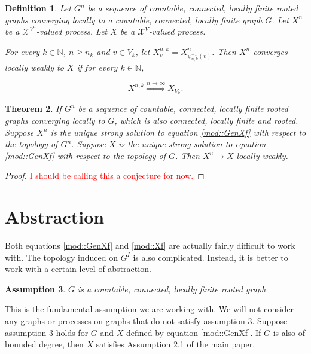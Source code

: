 \documentclass[12pt]{article}
\newcommand{\mb}{\mathbb}
\newcommand{\mc}{\mathcal}
\newcommand{\ra}{\rightarrow}
\newcommand{\os}{\overset}
\newcommand{\tr}{\textcolor{red}}
\newcommand{\ind}{\hspace{24pt}}
\newcommand{\Xf}{X}									%
\newcommand{\stte}{\mc{X}}							%
\newcommand{\inter}[1]{#1^I}
\newtheorem{thms}{Theorem}[section]
\newtheorem{defn}[thms]{Definition}
\newtheorem{assu}[thms]{Assumption}
\begin{document}
\begin{defn}
Let \(G^n\) be a sequence of countable, connected, locally finite rooted graphs converging locally to a countable, connected, locally finite graph \(G\). Let \(\Xf^n\) be a \(\stte^{V^n}\)-valued process. Let \(\Xf\) be a \(\stte^V\)-valued process. 

\ind For every \(k\in \mb{N}\), \(n \geq n_k\) and \(v \in V_k\), let \(\Xf^{n,k}_v = \Xf^n_{\psi_{n,k}^{-1}(v)}\). Then \(\Xf^n\) converges locally weakly to \(\Xf\) if for every \(k \in \mb{N}\),

\[\Xf^{n,k} \os{n\ra\infty}{\Rightarrow} \Xf_{V_k}.\]
\label{mod::locweak}
\end{defn}

\begin{thms}
If \(G^n\) be a sequence of countable, connected, locally finite rooted graphs converging locally to \(G\), which is also connected, locally finite and rooted. Suppose \(\Xf^n\) is the unique strong solution to equation \eqref{mod::GenXf} with respect to the topology of \(G^n\). Suppose \(\Xf\) is the unique strong solution to equation \eqref{mod::GenXf} with respect to the topology of \(G\). Then \(\Xf^n \ra \Xf\) locally weakly.
\label{lblocweak}
\end{thms}
\begin{proof}
\tr{I should be calling this a conjecture for now.}
\end{proof}

\section{Abstraction}
\label{abs}

Both equations \eqref{mod::GenXf} and \eqref{mod::Xf} are actually fairly difficult to work with. The topology induced on \(\inter{G}\) is also complicated. Instead, it is better to work with a certain level of abstraction.

\begin{assu}
\(G\) is a countable, connected, locally finite rooted graph.
\label{abs::basics}
\end{assu}

This is the fundamental assumption we are working with. We will not consider any graphs or processes on graphs that do not satisfy assumption \ref{abs::basics}. Suppose assumption \ref{abs::basics} holds for \(G\) and \(\Xf\) defined by equation \eqref{mod::GenXf}. If \(G\) is also of bounded degree, then \(\Xf\) satisfies Assumption 2.1 of the main paper. 
\end{document}
